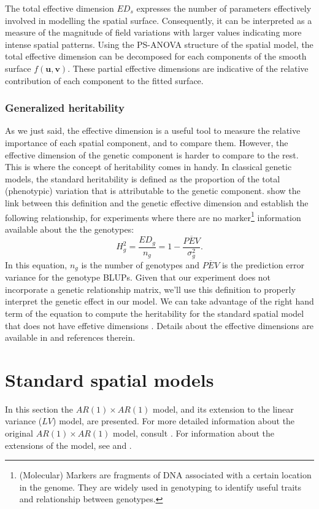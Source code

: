 The total effective dimension $ED_{s}$ expresses the number of parameters effectively involved in modelling the spatial surface.
Consequently, it can be interpreted as a measure of the magnitude of field variations with larger values indicating more intense spatial patterns. 
Using the PS-ANOVA structure of the spatial model, the total effective dimension can be decomposed for each components of the smooth surface $f(\boldsymbol{u},\boldsymbol{v})$.  These partial effective dimensions are indicative of the relative contribution of each component to the fitted surface.

\subsubsection{Generalized heritability}
As we just said, the effective dimension is a useful tool to measure the relative importance of each spatial component, and to compare them. However, the effective dimension of the genetic component is harder to compare to the rest. This is where the concept of heritability comes in handy. In classical genetic models, the standard heritability is defined as the proportion of the total (phenotypic) variation that is attributable to the genetic component. \textcite{rodriguez-alvarez_correcting_2018} show the link between this definition and the genetic effective dimension and establish the following relationship, for experiments where there are no marker\footnote{(Molecular) Markers are fragments of DNA associated with a certain location in the genome. They are widely used in genotyping to identify useful traits and relationship between genotypes.} information available about the the genotypes:
\begin{equation}
H_{g}^2 = \dfrac{ED_{g}}{n_{g}} = 1 - \dfrac{\overline{PEV}}{\sigma^2_{g}}
\text{.}
\end{equation}
In this equation, $n_{g}$ is the number of genotypes and $\overline{PEV}$ is the prediction error variance for the genotype BLUPs. Given that our experiment does not incorporate a genetic relationship matrix, we'll use this definition to properly interpret the genetic effect in our model. We can take advantage of the right hand term of the equation to compute the heritability for the standard spatial model that does not have effetive dimensions \textcite{welham2010comparison}. Details about the effective dimensions are available in \textcite{rodriguez-alvarez_correcting_2018} and references therein.

\section{Standard spatial models}
\label{sec:arxar_model}
In this section the $AR(1) \times AR(1)$ model, and its extension to the linear variance ($LV$) model, are presented. For more detailed information about the original $AR(1) \times AR(1)$ model, consult \textcite{gilmour_accounting_1997}. For information about the extensions of the model, see \textcite{piepho_linear_2010} and \textcite{williams_neighbour_1986}.\\

